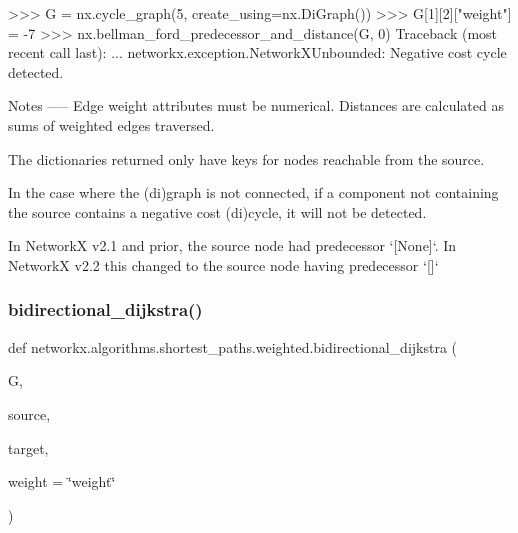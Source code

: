 \begin{DoxyVerb}
>>> G = nx.cycle_graph(5, create_using=nx.DiGraph())
>>> G[1][2]["weight"] = -7
>>> nx.bellman_ford_predecessor_and_distance(G, 0)
Traceback (most recent call last):
    ...
networkx.exception.NetworkXUnbounded: Negative cost cycle detected.

Notes
-----
Edge weight attributes must be numerical.
Distances are calculated as sums of weighted edges traversed.

The dictionaries returned only have keys for nodes reachable from
the source.

In the case where the (di)graph is not connected, if a component
not containing the source contains a negative cost (di)cycle, it
will not be detected.

In NetworkX v2.1 and prior, the source node had predecessor `[None]`.
In NetworkX v2.2 this changed to the source node having predecessor `[]`
\end{DoxyVerb}
 \mbox{\label{namespacenetworkx_1_1algorithms_1_1shortest__paths_1_1weighted_a4eb8421faed983fc247d9ad2e789645d}} 
\subsubsection{\texorpdfstring{bidirectional\+\_\+dijkstra()}{bidirectional\_dijkstra()}}
{\footnotesize\ttfamily def networkx.\+algorithms.\+shortest\+\_\+paths.\+weighted.\+bidirectional\+\_\+dijkstra (\begin{DoxyParamCaption}\item[{}]{G,  }\item[{}]{source,  }\item[{}]{target,  }\item[{}]{weight = {\ttfamily \char`\"{}weight\char`\"{}} }\end{DoxyParamCaption})}

